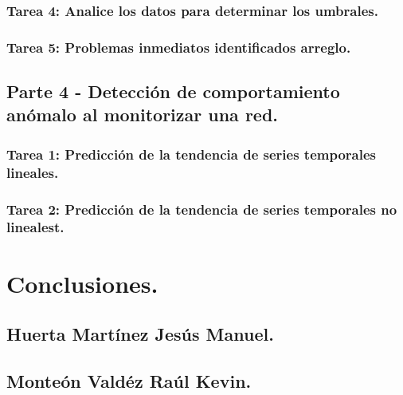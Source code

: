 \documentclass[oneside,10pt]{book}
\begin{document}
\subsection{Tarea 4: Analice los datos para determinar los umbrales.}

\subsection{Tarea 5: Problemas inmediatos identificados arreglo.}


\section{Parte 4 - Detección de comportamiento anómalo al monitorizar una red.}

\subsection{Tarea 1: Predicción de la tendencia de series temporales lineales.}

\subsection{Tarea 2: Predicción de la tendencia de series temporales no linealest.}


\chapter{Conclusiones.}

\section{Huerta Martínez Jesús Manuel.}

\section{Monteón Valdéz Raúl Kevin.}
\end{document}
